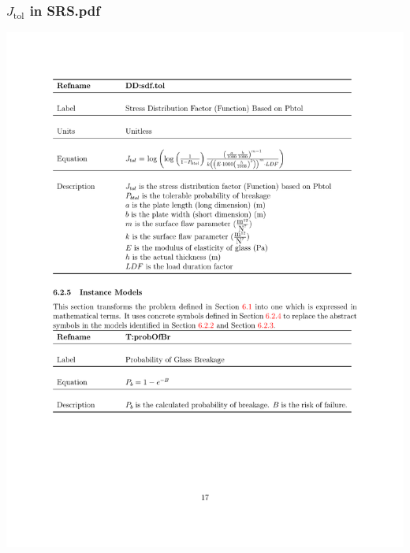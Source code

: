 \documentclass[t,12pt,numbers,fleqn]{beamer}
\begin{document}





\begin{frame}

\frametitle{$J_{\mbox{tol}}$ in SRS.pdf}
\begin{center}
\includegraphics[width=1.0\textwidth]{../Figures/Jtol_pdf.pdf}
\end{center}
\end{frame}
\end{document}

